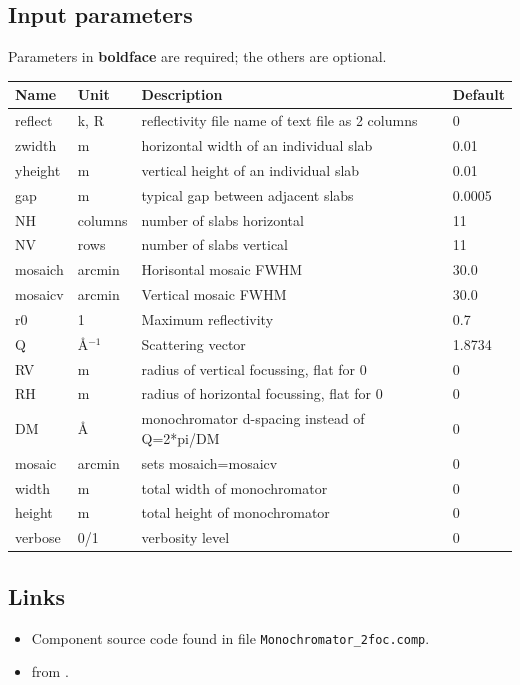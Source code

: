 \subsection*{Input parameters}
Parameters in \textbf{boldface} are required; the others are optional.

\begin{longtable}{p{}p{}p{}p{}}
\toprule
\textbf{Name} & \textbf{Unit} & \textbf{Description} & \textbf{Default} \\
\midrule
\endhead
reflect & k, R & reflectivity file name of text file as 2 columns & 0 \\
zwidth & m & horizontal width of an individual slab & 0.01 \\
yheight & m & vertical height of an individual slab & 0.01 \\
gap & m & typical gap  between adjacent slabs & 0.0005 \\
NH & columns & number of slabs horizontal & 11 \\
NV & rows & number of slabs vertical & 11 \\
mosaich & arcmin & Horisontal mosaic FWHM & 30.0 \\
mosaicv & arcmin & Vertical mosaic FWHM & 30.0 \\
r0 & 1 & Maximum reflectivity & 0.7 \\
Q & \AA{}$^{-1}$ & Scattering vector & 1.8734 \\
RV & m & radius of vertical focussing, flat for 0 & 0 \\
RH & m & radius of horizontal focussing, flat for 0 & 0 \\
DM & \AA{} & monochromator d-spacing instead of Q=2*pi/DM & 0 \\
mosaic & arcmin & sets mosaich=mosaicv & 0 \\
width & m & total width of monochromator & 0 \\
height & m & total height of monochromator & 0 \\
verbose & 0/1 & verbosity level & 0 \\
\bottomrule
\end{longtable}

\subsection*{Links}
\begin{itemize}
  \item Component source code found in file \texttt{Monochromator\_2foc.comp}.
  \item {} from .
\end{itemize}
